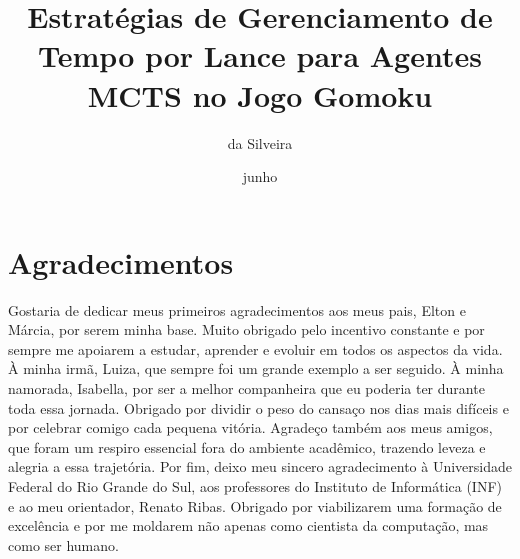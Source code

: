 \documentclass[cic,tc]{iiufrgs}
\title{Estratégias de Gerenciamento de Tempo por Lance para Agentes MCTS no Jogo Gomoku}
\author{da Silveira}{Arthur Tonial}
\date{junho}{2026}
\begin{document}
\maketitle

\chapter*{Agradecimentos}
Gostaria de dedicar meus primeiros agradecimentos aos meus pais, Elton e Márcia, por serem minha base. Muito obrigado pelo incentivo constante e por sempre me apoiarem a estudar, aprender e evoluir em todos os aspectos da vida. À minha irmã, Luiza, que sempre foi um grande exemplo a ser seguido. À minha namorada, Isabella, por ser a melhor companheira que eu poderia ter durante toda essa jornada. Obrigado por dividir o peso do cansaço nos dias mais difíceis e por celebrar comigo cada pequena vitória. Agradeço também aos meus amigos, que foram um respiro essencial fora do ambiente acadêmico, trazendo leveza e alegria a essa trajetória. Por fim, deixo meu sincero agradecimento à Universidade Federal do Rio Grande do Sul, aos professores do Instituto de Informática (INF) e ao meu orientador, Renato Ribas. Obrigado por viabilizarem uma formação de excelência e por me moldarem não apenas como cientista da computação, mas como ser humano.
\end{document}
